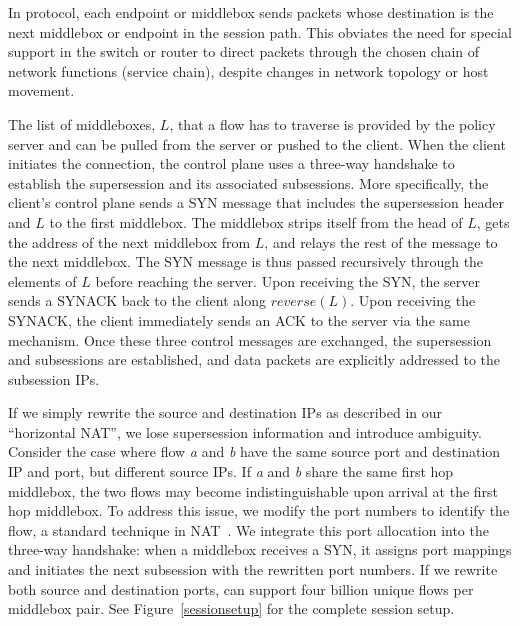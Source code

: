In \system protocol, each endpoint or middlebox sends packets whose destination is the next middlebox or endpoint in the session path. This obviates the need for special support in the switch or router to direct packets through the chosen chain of network functions (service chain), despite changes in network topology or host movement. 

The list of middleboxes, $L$, that a flow has to traverse is provided by the policy server and can be pulled from the server or pushed to the client. When the client initiates the connection, the control plane uses a three-way handshake to establish the supersession and its associated subsessions. More specifically, the client's control plane sends a SYN message that includes the supersession header and $L$ to the first middlebox. The middlebox strips itself from the head of $L$, gets the address of the next middlebox from $L$, and relays the rest of the message to the next middlebox. The SYN message is thus passed recursively through the elements of $L$ before reaching the server. Upon receiving the SYN, the server sends a SYNACK back to the client along $reverse(L)$. Upon receiving the SYNACK, the client immediately sends an ACK to the server via the same mechanism. Once these three control messages are exchanged, the supersession and subsessions are established, and data packets are explicitly addressed to the subsession IPs.

If we simply rewrite the source and destination IPs as described in our ``horizontal NAT'', we lose supersession information and introduce ambiguity. Consider the case where flow \textit{a} and \textit{b} have the same source port and destination IP and port, but different source IPs. If \textit{a} and \textit{b} share the same first hop middlebox, the two flows may become indistinguishable upon arrival at the first hop middlebox. To address this issue, we modify the port numbers to identify the flow, a standard technique in NAT~\cite{NAT}. We integrate this port allocation into the three-way handshake: when a middlebox receives a SYN, it assigns port mappings and initiates the next subsession with the rewritten port numbers. If we rewrite both source and destination ports, \system can support four billion unique flows per middlebox pair. See Figure~\ref{sessionsetup} for the complete session setup. 

